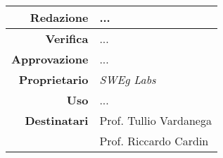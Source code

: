\thispagestyle{empty} %

\begin{center}
    \begin{tabular}{r|l}
        \textbf{Redazione} & ... \\
        \hline
        \textbf{Verifica} & ... \\
        \hline
        \textbf{Approvazione} & ... \\
        \hline
        \textbf{Proprietario} & \emph{SWEg Labs} \\
        \hline
        \textbf{Uso} & ... \\
        \hline
        \textbf{Destinatari} & Prof. Tullio Vardanega \\
                             & Prof. Riccardo Cardin \\
    \end{tabular}
\end{center}
    
